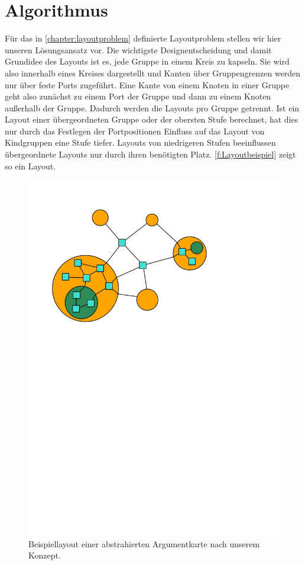 \chapter{Algorithmus} %
\label{chapter:algo}

Für das in \autoref{chapter:layoutproblem} definierte Layoutproblem stellen wir hier unseren Lösungsansatz vor.
Die wichtigste Designentscheidung und damit Grundidee des Layouts ist es, jede Gruppe in einem Kreis zu kapseln. 
Sie wird also innerhalb eines Kreises dargestellt und Kanten über Gruppengrenzen werden nur über feste Ports zugeführt.
Eine Kante von einem Knoten in einer Gruppe geht also zunächst zu einem Port der Gruppe und dann zu einem Knoten außerhalb der Gruppe.
Dadurch werden die Layouts pro Gruppe getrennt. Ist ein Layout einer übergeordneten Gruppe oder der obersten Stufe berechnet, 
hat dies nur durch das Festlegen der Portpositionen Einfluss auf das Layout von Kindgruppen eine Stufe tiefer. 
Layouts von niedrigeren Stufen beeinflussen übergeordnete Layouts nur durch ihren benötigten Platz.
\autoref{f:Layoutbeispiel} zeigt so ein Layout.

\begin{figure}[h!]
\begin{center} 
  \includegraphics[width=0.7\linewidth]{Pics/Layoutbeispiel.pdf}
  \caption{Beispiellayout einer abstrahierten Argumentkarte nach unserem Konzept.}
  \label{f:Layoutbeispiel}
\end{center}
\end{figure}

